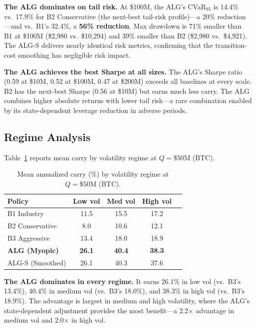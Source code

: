 \documentclass[11pt]{article}
\begin{document}
\textbf{The ALG dominates on tail risk.} At \$100M, the ALG's CVaR$_{95}$ is 14.4\% vs.\ 17.9\% for B2 Conservative (the next-best tail-risk profile)---a 20\% reduction---and vs.\ B1's 32.4\%, a \textbf{56\% reduction}. Max drawdown is 71\% smaller than B1 at \$100M (\$2,980 vs.\ \$10,294) and 39\% smaller than B2 (\$2,980 vs.\ \$4,921). The ALG-S delivers nearly identical risk metrics, confirming that the transition-cost smoothing has negligible risk impact.

\textbf{The ALG achieves the best Sharpe at all sizes.} The ALG's Sharpe ratio (0.59 at \$10M, 0.52 at \$100M, 0.47 at \$200M) exceeds all baselines at every scale. B2 has the next-best Sharpe (0.56 at \$10M) but earns much less carry. The ALG combines higher absolute returns with lower tail risk---a rare combination enabled by its state-dependent leverage reduction in adverse periods.

\subsection{Regime Analysis}

Table~\ref{tab:regimes} reports mean carry by volatility regime at $Q = \$50$M (BTC).

\begin{table}[htbp]
\centering
\caption{Mean annualized carry (\%) by volatility regime at $Q = \$50$M (BTC).}
\label{tab:regimes}
\begin{tabular}{lcccc}
\toprule
Policy & Low vol & Med vol & High vol \\
\midrule
B1 Industry & 11.5 & 15.5 & 17.2 \\
B2 Conservative & 8.0 & 10.6 & 12.1 \\
B3 Aggressive & 13.4 & 18.0 & 18.9 \\
\textbf{ALG (Myopic)} & \textbf{26.1} & \textbf{40.4} & \textbf{38.3} \\
ALG-S (Smoothed) & 26.1 & 40.3 & 37.6 \\
\bottomrule
\end{tabular}
\end{table}

\textbf{The ALG dominates in every regime.} It earns 26.1\% in low vol (vs.\ B3's 13.4\%), 40.4\% in medium vol (vs.\ B3's 18.0\%), and 38.3\% in high vol (vs.\ B3's 18.9\%). The advantage is largest in medium and high volatility, where the ALG's state-dependent adjustment provides the most benefit---a 2.2$\times$ advantage in medium vol and 2.0$\times$ in high vol.
\end{document}
